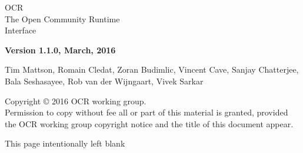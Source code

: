 
\begin{titlepage}

  \begin{adjustwidth}{-0.75in}{0in}
    \begin{center}
      \Huge
      \textsf{OCR\\The Open Community Runtime \\Interface}

      \vspace{0.5in}\textsf{ }\vspace{-0.7in}
      \normalsize
      \vspace{1.0in}
      \textbf{Version 1.1.0, March, 2016}
      \vspace{1.0in}

Tim Mattson, Romain Cledat, Zoran Budimlic,
Vincent Cave, Sanjay Chatterjee, Bala Seshasayee, Rob van der Wijngaart,
Vivek Sarkar
    \end{center}
  \end{adjustwidth}
  \vspace{2.0in}

  \begin{adjustwidth}{0pt}{1em}\setlength{\parskip}{0.25\baselineskip}%
Copyright © 2016 OCR working group.\\
Permission to copy without fee all or part of this material is granted,
provided the OCR working group copyright notice and
the title of this document appear.
  \end{adjustwidth}
\end{titlepage}


\clearpage
\thispagestyle{empty}
\phantom{a}
This page intentionally left blank
\vfill
